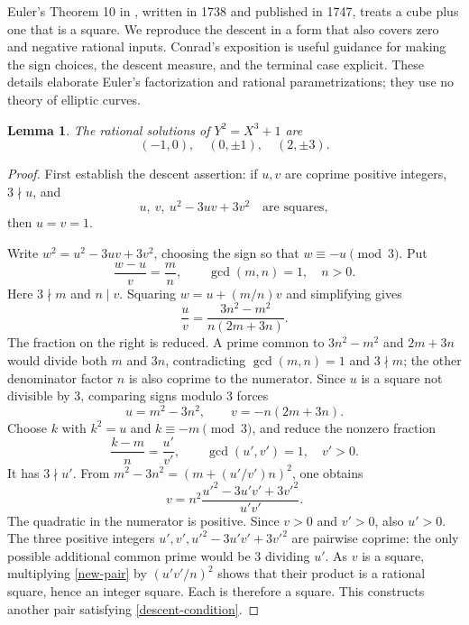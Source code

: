 \documentclass[11pt]{article}
\newtheorem{lemma}[theorem]{Lemma}
\begin{document}
Euler's Theorem 10 in \cite{euler}, written in 1738 and published
in 1747, treats a cube plus one that is a square. We reproduce the
descent in a form that also covers zero and negative rational inputs.
Conrad's exposition \cite{conrad} is useful guidance for making the
sign choices, the descent measure, and the terminal case explicit.
These details elaborate Euler's factorization and rational
parametrizations; they use no theory of elliptic curves.

\begin{lemma}\label{euler}
The rational solutions of \(Y^2=X^3+1\) are
\[
 (-1,0),\quad(0,\pm1),\quad(2,\pm3).
\]
\end{lemma}

\begin{proof}
First establish the descent assertion: if \(u,v\) are coprime
positive integers, \(3\nmid u\), and
\begin{equation}\label{descent-condition}
 u,\ v,\ u^2-3uv+3v^2\quad\text{are squares},
\end{equation}
then \(u=v=1\).

Write \(w^2=u^2-3uv+3v^2\), choosing the sign so that
\(w\equiv-u\pmod3\). Put
\[
 \frac{w-u}{v}=\frac mn,\qquad \gcd(m,n)=1,\quad n>0.
\]
Here \(3\nmid m\) and \(n\mid v\). Squaring
\(w=u+(m/n)v\) and simplifying gives
\[
 \frac uv=\frac{3n^2-m^2}{n(2m+3n)}.
\]
The fraction on the right is reduced. A prime common to
\(3n^2-m^2\) and \(2m+3n\) would divide both \(m\) and
\(3n\), contradicting \(\gcd(m,n)=1\) and \(3\nmid m\);
the other denominator factor \(n\) is also coprime to the numerator.
Since \(u\) is a square not divisible by 3, comparing signs modulo 3
forces
\begin{equation}\label{mn-pair}
 u=m^2-3n^2,\qquad v=-n(2m+3n).
\end{equation}
Choose \(k\) with \(k^2=u\) and \(k\equiv-m\pmod3\), and
reduce the nonzero fraction
\[
 \frac{k-m}{n}=\frac{u'}{v'},\qquad \gcd(u',v')=1,\quad v'>0.
\]
It has \(3\nmid u'\). From
\(m^2-3n^2=(m+(u'/v')n)^2\), one obtains
\begin{equation}\label{new-pair}
 v=n^2\frac{u'^2-3u'v'+3v'^2}{u'v'}.
\end{equation}
The quadratic in the numerator is positive. Since \(v>0\) and
\(v'>0\), also \(u'>0\). The three positive integers
\(u',v',u'^2-3u'v'+3v'^2\) are pairwise coprime: the only
possible additional common prime would be 3 dividing \(u'\).
As \(v\) is a square, multiplying \eqref{new-pair} by
\((u'v'/n)^2\) shows that their product is a rational square,
hence an integer square. Each is therefore a square. This constructs
another pair satisfying \eqref{descent-condition}.


\end{proof}
\end{document}
